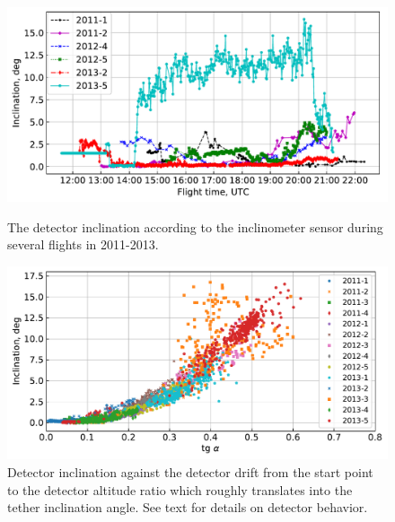 \documentclass[final,5p,times,twocolumn]{elsarticle}
\begin{document}
\begin{figure}[tb]
    \begin{minipage}[t]{0.48\textwidth}
    \centering
       \includegraphics[width=\textwidth]{Telemetry_inclination.pdf}
       \caption{The detector inclination according to the inclinometer sensor during several flights in 2011-2013.}
    \label{fig:inclination} 
    \end{minipage}
    \hfill
    \begin{minipage}[t]{0.48\textwidth}
    \centering
       \includegraphics[width=\textwidth]{tg-inclination.pdf}
       \caption{Detector inclination against the detector drift from the start point to the detector altitude ratio which roughly translates into the tether inclination angle. See text for details on detector behavior.}
\label{fig:drift-inclination}
   
    \end{minipage}
\end{figure}
\end{document}
